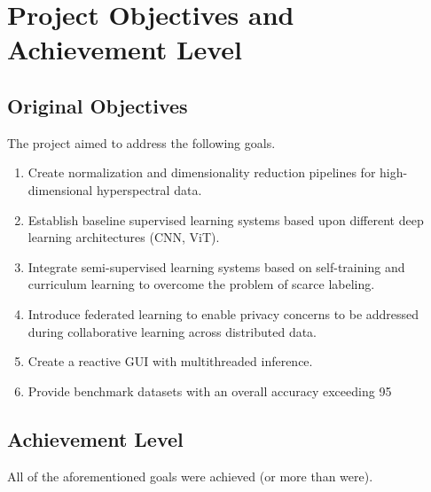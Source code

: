 \section{Project Objectives and Achievement Level}

\subsection{Original Objectives}
The project aimed to address the following goals.
\begin{enumerate}
    \item Create normalization and dimensionality reduction pipelines for high-dimensional hyperspectral data.
    \item Establish baseline supervised learning systems based upon different deep learning architectures (CNN, ViT).
    \item Integrate semi-supervised learning systems based on self-training and curriculum learning to overcome the problem of scarce labeling.
    \item Introduce federated learning to enable privacy concerns to be addressed during collaborative learning across distributed data.
    \item Create a reactive GUI with multithreaded inference.
    \item Provide benchmark datasets with an overall accuracy exceeding 95%
\end{enumerate}

\subsection{Achievement Level}
All of the aforementioned goals were achieved (or more than were).

\begin{table}[H]
    \centering
    \caption{Project Objectives and Achievement Level}
    \label{tab:objectives}
    \renewcommand{\arraystretch}{1.3}
\end{table}

